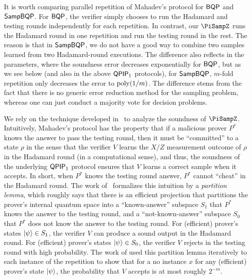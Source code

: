 It is worth comparing parallel repetition of Mahadev's protocol for $\operatorname{\mathsf{BQP}}$ and $\operatorname{\mathsf{SampBQP}}$. For $\operatorname{\mathsf{BQP}}$, the verifier simply chooses to run the Hadamard and testing rounds independently for each repetition. In contrast, our $\PiSampZ$ runs the Hadamard round in one repetition and run the testing round in the rest. The reason is that in $\operatorname{\mathsf{SampBQP}}$, we do not have a good way to combine two samples learned from two Hadamard-round executions. The difference also reflects in the parameters, where the soundness error decreases exponentially for $\operatorname{\mathsf{BQP}}$, but as we see below (and also in the above $\operatorname{\mathsf{QPIP}}_1$ protocols), for $\operatorname{\mathsf{SampBQP}}$, $m$-fold repetition only decreases the error to $\operatorname*{\operatorname{poly}}(1/m)$. The difference stems from the fact that there is no generic error reduction method for the sampling problem, whereas one can just conduct a majority vote for decision problems.

We rely on the technique developed in~\cite{arXiv:ChiaChungYam19} to analyze the soundness of $\PiSampZ$. Intuitively, Mahadev's protocol has the property that if a malicious prover $P^*$ knows the answer to pass the testing round, then it must be ``committed'' to a state $\rho$ in the sense that the verifier $V$ learns the $X/Z$ measurement outcome of $\rho$ in the Hadamard round (in a computational sense), and thus, the soundness of the underlying $\operatorname{\mathsf{QPIP}}_1$ protocol ensures that $V$ learns a correct sample when it accepts. In short, when $P^*$ knows the testing round answer,  $P^*$ cannot ``cheat'' in the Hadamard round. The work of~\cite{arXiv:ChiaChungYam19} formalizes this intuition by a \emph{partition lemma}, which roughly says that there is an efficient projection that partitions the prover's internal quantum space into a ``known-answer'' subspace $S_1$ that $P^*$ knows the answer to the testing round, and a ``not-known-answer'' subspace $S_0$ that $P^*$ does not know the answer to the testing round. For (efficient) prover's states $\ket{\psi} \in S_1$, the verifier $V$ can produce a sound output in the Hadamard round. For (efficient) prover's states $\ket{\psi} \in S_0$, the verifier $V$ rejects in the testing round with high probability. The work of \cite{arXiv:ChiaChungYam19} used this partition lemma iteratively to each instance of the repetition to show that for a no instance $x$ for any (efficient) prover's state $\ket{\psi}$, the probability that $V$ accepts is at most roughly $2^{-m}$.

